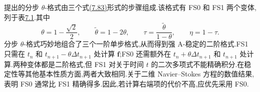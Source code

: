\begin{example}[分步 $\theta$-格式]
\label{ex:fractional-step-theta-scheme}
\textcite{BristeauGlowinskiPeriaux1987} 提出的分步 $\theta$-格式由三个式\hyperref[eq:general-theta-scheme]{(7.83)}形式的步骤组成.该格式有 FS0 和 FS1 两个变体,列于表\hyperref[tab:fractional-step-theta-variants]{7.1}.其中
\[
  \theta=1-\frac{\sqrt{2}}{2},\qquad
  \widetilde{\theta}=1-2\theta,\qquad
  \tau=\frac{\widetilde{\theta}}{1-\theta},\qquad
  \eta=1-\tau.
\]
分步 $\theta$-格式巧妙地组合了三个一阶单步格式,从而得到强 A-稳定的二阶格式.FS1 只需在 $t_n$ 和 $t_{n+1}-\theta\Delta t_{n+1}$ 处计算 $\bm{f}$;FS0 还需额外在 $t_n+\theta\Delta t_{n+1}$ 和 $t_{n+1}$ 处计算.两种变体都是二阶格式,但 FS1 对关于时间 $t$ 的二次多项式不能精确积分.在稳定性等其他基本性质方面,两者大致相同.关于二维 Navier--Stokes 方程的数值结果,\textcite{JohnMatthiesRang2006a} 表明 FS0 通常比 FS1 精确得多.因此,若计算右端项的代价不高,应优先采用 FS0.

\begin{eleganttable}
\centering
{}
\label{tab:fractional-step-theta-variants}
\scriptsize
\setlength{\tabcolsep}{2.5pt}
\renewcommand{\arraystretch}{1.16}
\end{eleganttable}
\end{example}

